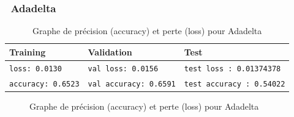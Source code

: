	\subsubsection*{\qquad \textbullet \ Adadelta}
		\begin{table}[H]
			\centering
			\begin{tabular}{l|l|l}
				\hline
				\textbf{Training} & \textbf{Validation} & \textbf{Test} \\
				\hline

				\texttt{loss: 0.0130} & \texttt{val loss: 0.0156} & \texttt{test loss : 0.01374378} \\
				\texttt{accuracy: 0.6523} & \texttt{val accuracy: 0.6591} & \texttt{test accuracy : 0.54022} \\
				
				\hline
				
			\end{tabular}
		
			\begin{figure}[H]
				\myfloatalign
				 \quad
				
				\caption[]{Graphe de précision (accuracy) et perte (loss)  pour Adadelta}
			\end{figure}
		\end{table}

